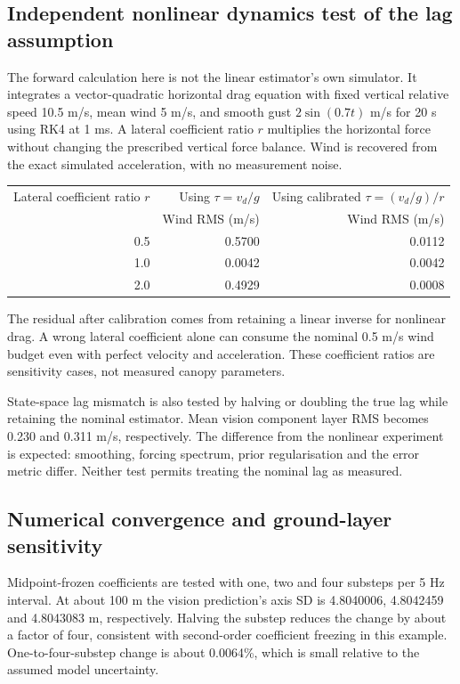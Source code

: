 \documentclass[11pt,a4paper]{article}
\numberwithin{equation}{section}
\begin{document}
\subsection{Independent nonlinear dynamics test of the lag assumption}
The forward calculation here is not the linear estimator's own simulator. It integrates a vector-quadratic horizontal drag equation with fixed vertical relative speed 10.5 m/s, mean wind 5 m/s, and smooth gust $2\sin(0.7t)$ m/s for 20 s using RK4 at 1 ms. A lateral coefficient ratio $r$ multiplies the horizontal force without changing the prescribed vertical force balance. Wind is recovered from the exact simulated acceleration, with no measurement noise.
\begin{center}
\begin{tabular}{rrr}
\toprule
Lateral coefficient ratio $r$ & Using $\tau=v_d/g$ & Using calibrated $\tau=(v_d/g)/r$\\
 & Wind RMS (m/s) & Wind RMS (m/s)\\
\midrule
0.5 & 0.5700 & 0.0112\\
1.0 & 0.0042 & 0.0042\\
2.0 & 0.4929 & 0.0008\\
\bottomrule
\end{tabular}
\end{center}
The residual after calibration comes from retaining a linear inverse for nonlinear drag. A wrong lateral coefficient alone can consume the nominal 0.5 m/s wind budget even with perfect velocity and acceleration. These coefficient ratios are sensitivity cases, not measured canopy parameters.

State-space lag mismatch is also tested by halving or doubling the true lag while retaining the nominal estimator. Mean vision component layer RMS becomes 0.230 and 0.311 m/s, respectively. The difference from the nonlinear experiment is expected: smoothing, forcing spectrum, prior regularisation and the error metric differ. Neither test permits treating the nominal lag as measured.

\subsection{Numerical convergence and ground-layer sensitivity}
Midpoint-frozen coefficients are tested with one, two and four substeps per 5 Hz interval. At about 100 m the vision prediction's axis SD is 4.8040006, 4.8042459 and 4.8043083 m, respectively. Halving the substep reduces the change by about a factor of four, consistent with second-order coefficient freezing in this example. One-to-four-substep change is about 0.0064\%, which is small relative to the assumed model uncertainty.
\end{document}

